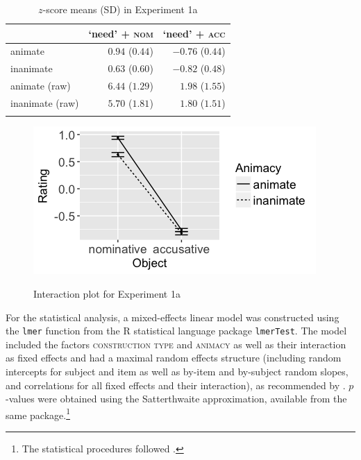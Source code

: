 \documentclass[output=paper,colorlinks,citecolor=brown]{langscibook}
\begin{document}
\begin{table}
\centering
\begin{tabularx}{0.65\textwidth}{Xrr}
\lsptoprule
 & `need' + \textsc{nom} & `need' + \textsc{acc}\\
\midrule
animate  &   $0.94$ ($0.44$) &   $-0.76$ ($0.44$)\\
inanimate  &   $0.63$ ($0.60$) &   $-0.82$ ($0.48$)\\
animate (raw)  &   $6.44$ ($1.29$) &   $1.98$ ($1.55$)\\
inanimate (raw)  &   $5.70$ ($1.81$) &   $1.80$ ($1.51$)\\
\lspbottomrule
\end{tabularx}
\caption{$z$-score means (SD) in Experiment 1a}
\label{tab:1:means-exp1a}
\end{table}

\begin{figure}
\caption{Interaction plot for Experiment 1a}
\centering
\includegraphics[scale = 0.5]{figures/exp1a_13.png}
\label{fig:exp1a}
\end{figure}

For the statistical analysis, a mixed-effects linear model was constructed using the \texttt{lmer} function from the R statistical language package \texttt{lmerTest}. The model included the factors \textsc{construction type} and \textsc{animacy} as well as their interaction as fixed effects and had a maximal random effects structure (including random intercepts for subject and item as well as by-item and by-subject random slopes, and correlations for all fixed effects and their interaction), as recommended by \citet{Barr.Levy2013}. $p$-values were obtained using the Satterthwaite approximation, available from the same package.\footnote{The statistical procedures followed \citet{Keshev.meltzerAsscher2019}.}
\end{document}
